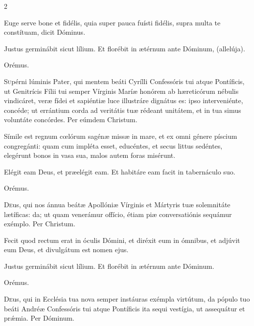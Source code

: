 \documentclass[9pt,twoside]{extarticle}
\begin{document}
\begin{multicols}{2}
\begin{tightlist}{}
\item {} Euge serve bone et fidélis, quia super pauca fuísti fidélis, supra multa te constítuam, dicit Dóminus.
\item {} Justus germinábit sicut lílium.  Et florébit in ætérnum ante Dóminum, (allelúja).
\item Orémus. \hfill {}
\end{tightlist}
\lettrine{S}upérni lúminis Pater, qui mentem beáti Cyrílli Confessóris tui atque Pontíficis, ut Genitrícis Fílii tui semper Vírginis Maríæ honórem ab hæreticórum nébulis vindicáret, veræ fídei et sapiéntiæ luce illustráre dignátus es: ipso interveniénte, concéde; ut errántium corda ad veritátis tuæ rédeant unitátem, et in tua simus voluntáte concórdes. Per eúmdem Christum.

\begin{tightlist}{}
\item {} Símile est regnum cœlórum sagénæ missæ in mare, et ex omni génere píscium congregánti: quam cum impléta esset, educéntes, et secus littus sedéntes, elegérunt bonos in vasa sua, malos autem foras misérunt.
\item {} Elégit eam Deus, et præelégit eam.  Et habitáre eam facit in tabernáculo suo.
\item Orémus. \hfill {}
\end{tightlist}
\lettrine{D}eus, qui nos ánnua beátæ Apollóniæ Vírginis et Mártyris tuæ solemnitáte lætíficas: da; ut quam venerámur offício, étiam piæ conversatiónis sequámur exémplo. Per Christum.

\begin{tightlist}{}
\item {} Fecit quod rectum erat in óculis Dómini, et diréxit eum in ómnibus, et adjúvit eum Deus, et divulgátum est nomen ejus.
\item {} Justus germinábit sicut lílium.  Et florébit in ætérnum ante Dóminum.
\item Orémus. \hfill {}
\end{tightlist}
\lettrine{D}eus, qui in Ecclésia tua nova semper instáuras exémpla virtútum, da pópulo tuo beáti Andréæ Confessóris tui atque Pontíficis ita sequi vestígia, ut assequátur et prǽmia. Per Dóminum.

\begin{tightlist}{}
\item {}
\end{tightlist}


\end{multicols}
\end{document}
